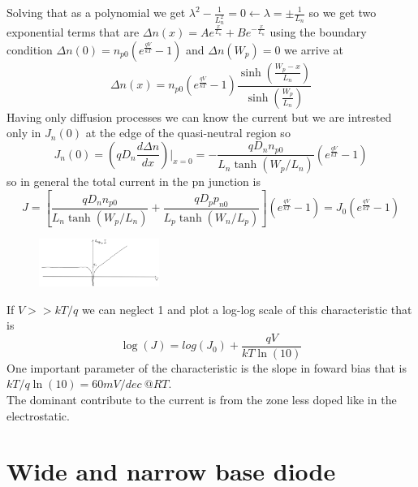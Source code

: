 Solving that as a polynomial we get $\lambda^2-\frac{1}{L_n^2}=0\leftarrow \lambda=\pm\frac{1}{L_n}$ so we get two exponential terms that are $\Delta n(x)=Ae^{\frac{x}{L_n}}+Be^{-\frac{x}{L_n}}$ using the boundary condition $\Delta n(0)=n_{p0}(e^{\frac{qV}{kT}}-1)$ and $\Delta n(W_p)=0$ we arrive at
\begin{equation}
\Delta n(x)=n_{p0}(e^{\frac{qV}{kT}}-1)\frac{\sinh(\frac{W_p-x}{L_n})}{\sinh(\frac{W_p}{L_n})}
\end{equation}
Having only diffusion processes we can know the current but we are intrested only in $J_n(0)$ at the edge of the quasi-neutral region so 
\begin{equation}
J_n(0)=(qD_n \frac{d\Delta n}{dx})|_{x=0}=-\frac{qD_nn_{p0}}{L_n\tanh(W_p/L_n)}(e^{\frac{qV}{kT}}-1)
\end{equation}
so in general the total current in the pn junction is 
\begin{equation}
J=[\frac{qD_nn_{p0}}{L_n\tanh(W_p/L_n)}+\frac{qD_pp_{n0}}{L_p\tanh(W_n/L_p)}](e^{\frac{qV}{kT}}-1)=J_0(e^{\frac{qV}{kT}}-1)
\end{equation}

\begin{figure}
\includegraphics[width=0.35\textwidth]{pn11.png}
\end{figure}


If $V>>kT/q$ we can neglect 1 and plot a log-log scale of this characteristic that is 
\begin{equation}
\log(J)=log(J_0)+\frac{qV}{kT\ln(10)}
\end{equation}
One important parameter of the characteristic is the slope in foward bias that is $kT/q \ln(10)=60mV/dec \ @RT$.\\
The dominant contribute to the current is from the zone less doped like in the electrostatic.\\

\section{Wide and narrow base diode}

